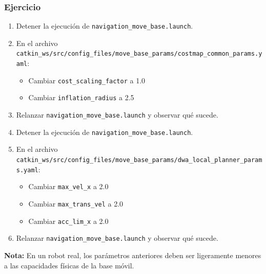 \documentclass[10pt,spanish,aspectratio=1610]{beamer}
\begin{document}
\begin{frame}\frametitle{Ejercicio}
  \begin{enumerate}
  \item Detener la ejecución de \texttt{navigation\_move\_base.launch}.
  \item En el archivo \texttt{catkin\_ws/src/config\_files/move\_base\_params/costmap\_common\_params.yaml}:
    \begin{itemize}
    \item Cambiar \texttt{cost\_scaling\_factor} a 1.0
    \item Cambiar \texttt{inflation\_radius} a 2.5
    \end{itemize}
  \item Relanzar \texttt{navigation\_move\_base.launch} y observar qué sucede.
  \item Detener la ejecución de \texttt{navigation\_move\_base.launch}.
  \item En el archivo \texttt{catkin\_ws/src/config\_files/move\_base\_params/dwa\_local\_planner\_params.yaml}:
    \begin{itemize}
    \item Cambiar \texttt{max\_vel\_x} a 2.0
    \item Cambiar \texttt{max\_trans\_vel} a 2.0
    \item Cambiar \texttt{acc\_lim\_x} a 2.0
    \end{itemize}
  \item Relanzar \texttt{navigation\_move\_base.launch} y observar qué sucede.
  \end{enumerate}
  \textbf{Nota:} En un robot real, los parámetros anteriores deben ser ligeramente menores a las capacidades físicas de la base móvil. 
\end{frame}

\end{document}
